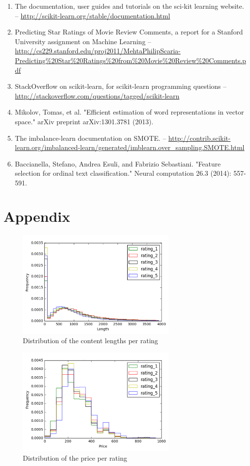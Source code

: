 \documentclass[a4paper,12pt]{article}
\begin{document}
\begin{enumerate}
    \item The documentation, user guides and tutorials on the  sci-kit learning website. -- \url{http://scikit-learn.org/stable/documentation.html}
    \item \label{ref:movie-reviews} Predicting Star Ratings of Movie Review Comments, a report for a Stanford University assignment on Machine Learning -- \url{http://cs229.stanford.edu/proj2011/MehtaPhilipScaria-Predicting%20Star%20Ratings%20from%20Movie%20Review%20Comments.pdf}
    \item StackOverflow on scikit-learn, for scikit-learn programming questions -- \url{http://stackoverflow.com/questions/tagged/scikit-learn}
    \item \label{ref:word2vec} Mikolov, Tomas, et al. "Efficient estimation of word representations in vector space." arXiv preprint arXiv:1301.3781 (2013).
    \item \label{ref:smote} The imbalance-learn documentation on SMOTE. -- \url{http://contrib.scikit-learn.org/imbalanced-learn/generated/imblearn.over_sampling.SMOTE.html}
    \item \label{ref:ordinal}Baccianella, Stefano, Andrea Esuli, and Fabrizio Sebastiani. "Feature selection for ordinal text classification." Neural computation 26.3 (2014): 557-591.
\end{enumerate}

\newpage
\section{Appendix}

\begin{figure}[H]
    \center
    \includegraphics[width=300px]{length_hist.png}
    \caption{Distribution of the content lengths per rating \label{fig:lengthDistr}}
\end{figure}

\begin{figure}[H]
    \center
    \includegraphics[width=300px]{hotel_hist.png}
    \caption{Distribution of the price per rating \label{fig:priceDistr}}
\end{figure}
\end{document}
